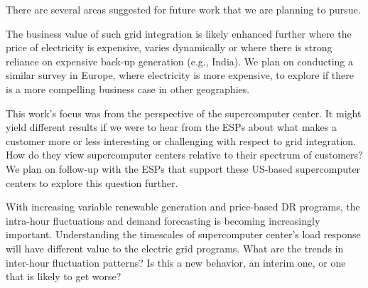 There are several areas suggested for future work that we are planning to pursue.

The business value of such grid integration is likely enhanced further where the price of 
electricity is expensive, varies dynamically or where there is strong reliance on expensive back-up 
generation (e.g., India).  We plan on conducting a similar survey in Europe, where electricity is more 
expensive, to explore if there is a more compelling business case in other geographies.    

This work's focus was from the perspective of the supercomputer center.  It might yield different 
results if we were to hear from the ESPs about what makes a customer more or less interesting or 
challenging with respect to grid integration.  How do they view supercomputer centers relative to their 
spectrum of customers?  We plan on follow-up with the ESPs that support these US-based supercomputer 
centers to explore this question further.

With increasing variable renewable generation and price-based DR programs, the intra-hour fluctuations 
and demand forecasting is becoming increasingly important. Understanding the timescales of supercomputer 
center's load response will have different value to the electric grid programs. What are the trends 
in inter-hour fluctuation patterns?  Is this a new behavior, an interim one, or one that is likely to get worse?  



